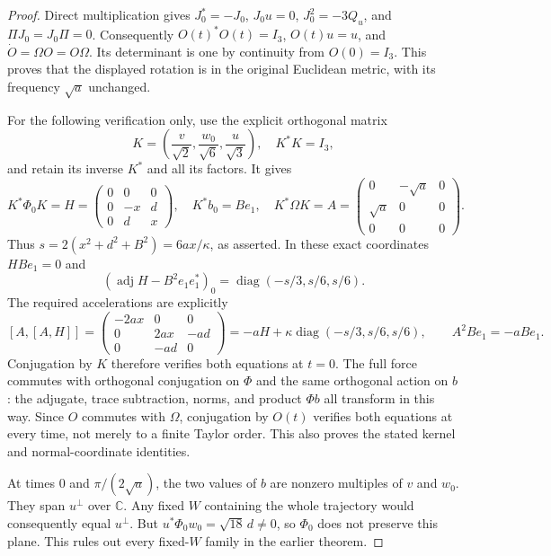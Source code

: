 \begin{proof}
Direct multiplication gives $J_0^*=-J_0$, $J_0u=0$,
$J_0^2=-3Q_u$, and $\Pi J_0=J_0\Pi=0$.
Consequently $O(t)^*O(t)=I_3$, $O(t)u=u$, and
$\dot O=\Omega O=O\Omega$. Its determinant is one by continuity from
$O(0)=I_3$. This proves that the displayed rotation is in the original
Euclidean metric, with its frequency $\sqrt a$ unchanged.

For the following verification only, use the explicit orthogonal matrix
\[
 K=\left(\frac v{\sqrt2},\frac{w_0}{\sqrt6},\frac u{\sqrt3}\right),
 \quad K^*K=I_3,
\]
and retain its inverse $K^*$ and all its factors. It gives
\[
 K^*\Phi_0K=
 H=\begin{pmatrix}0&0&0\\0&-x&d\\0&d&x\end{pmatrix},
 \quad K^*b_0=Be_1,\quad
 K^*\Omega K=A=\begin{pmatrix}0&-\sqrt a&0\\\sqrt a&0&0\\0&0&0\end{pmatrix}.
\]
Thus $s=2(x^2+d^2+B^2)=6ax/\kappa$, as asserted.
In these exact coordinates $HBe_1=0$ and
\[
 (\operatorname{adj}H-B^2e_1e_1^*)_0
    =\operatorname{diag}(-s/3,s/6,s/6).
\]
The required accelerations are explicitly
\[
 [A,[A,H]]=
 \begin{pmatrix}-2ax&0&0\\0&2ax&-ad\\0&-ad&0\end{pmatrix}
 =-aH+\kappa\operatorname{diag}(-s/3,s/6,s/6),
 \qquad A^2Be_1=-aBe_1.
\]
Conjugation by $K$ therefore verifies both equations at $t=0$.
The full force commutes with orthogonal conjugation on $\Phi$ and the
same orthogonal action on $b$: the adjugate, trace subtraction, norms,
and product $\Phi b$ all transform in this way. Since $O$ commutes with
$\Omega$, conjugation by $O(t)$ verifies both equations at every time,
not merely to a finite Taylor order. This also proves the stated kernel
and normal-coordinate identities.

At times $0$ and $\pi/(2\sqrt a)$, the two values of $b$ are nonzero
multiples of $v$ and $w_0$. They span $u^\perp$ over $\mathbb C$.
Any fixed $W$ containing the whole trajectory would consequently equal
$u^\perp$. But
$u^*\Phi_0w_0=\sqrt{18}\,d\ne0$, so $\Phi_0$ does not preserve this
plane. This rules out every fixed-$W$ family in the earlier theorem.
\end{proof}

